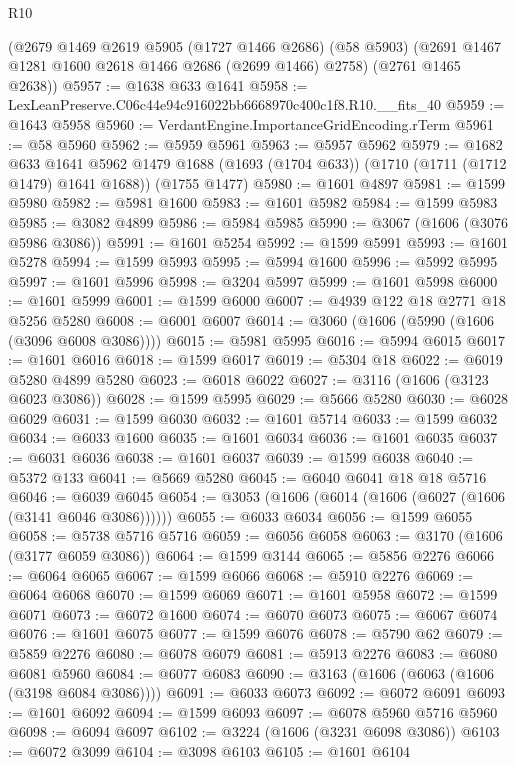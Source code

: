 \begin{lexlean}{R10}
\begin{coremodule}
    (@2679
      @1469
      @2619
      @5905
      (@1727 @1466 @2686)
      (@58 @5903)
      (@2691 @1467 @1281 @1600 @2618 @1466 @2686 (@2699 @1466) @2758)
      (@2761 @1465 @2638))
@5957 := @1638 @633 @1641
@5958 := LexLeanPreserve.C06c44e94c916022bb6668970c400c1f8.R10.__fits_40
@5959 := @1643 @5958
@5960 := VerdantEngine.ImportanceGridEncoding.rTerm
@5961 := @58 @5960
@5962 := @5959 @5961
@5963 := @5957 @5962
@5979 := @1682
    @633
    @1641
    @5962
    @1479
    @1688
    (@1693 (@1704 @633))
    (@1710 (@1711 (@1712 @1479) @1641 @1688))
    (@1755 @1477)
@5980 := @1601 @4897
@5981 := @1599 @5980
@5982 := @5981 @1600
@5983 := @1601 @5982
@5984 := @1599 @5983
@5985 := @3082 @4899
@5986 := @5984 @5985
@5990 := @3067 (@1606 (@3076 @5986 @3086))
@5991 := @1601 @5254
@5992 := @1599 @5991
@5993 := @1601 @5278
@5994 := @1599 @5993
@5995 := @5994 @1600
@5996 := @5992 @5995
@5997 := @1601 @5996
@5998 := @3204 @5997
@5999 := @1601 @5998
@6000 := @1601 @5999
@6001 := @1599 @6000
@6007 := @4939 @122 @18 @2771 @18 @5256 @5280
@6008 := @6001 @6007
@6014 := @3060 (@1606 (@5990 (@1606 (@3096 @6008 @3086))))
@6015 := @5981 @5995
@6016 := @5994 @6015
@6017 := @1601 @6016
@6018 := @1599 @6017
@6019 := @5304 @18
@6022 := @6019 @5280 @4899 @5280
@6023 := @6018 @6022
@6027 := @3116 (@1606 (@3123 @6023 @3086))
@6028 := @1599 @5995
@6029 := @5666 @5280
@6030 := @6028 @6029
@6031 := @1599 @6030
@6032 := @1601 @5714
@6033 := @1599 @6032
@6034 := @6033 @1600
@6035 := @1601 @6034
@6036 := @1601 @6035
@6037 := @6031 @6036
@6038 := @1601 @6037
@6039 := @1599 @6038
@6040 := @5372 @133
@6041 := @5669 @5280
@6045 := @6040 @6041 @18 @18 @5716
@6046 := @6039 @6045
@6054 := @3053 (@1606 (@6014 (@1606 (@6027 (@1606 (@3141 @6046 @3086))))))
@6055 := @6033 @6034
@6056 := @1599 @6055
@6058 := @5738 @5716 @5716
@6059 := @6056 @6058
@6063 := @3170 (@1606 (@3177 @6059 @3086))
@6064 := @1599 @3144
@6065 := @5856 @2276
@6066 := @6064 @6065
@6067 := @1599 @6066
@6068 := @5910 @2276
@6069 := @6064 @6068
@6070 := @1599 @6069
@6071 := @1601 @5958
@6072 := @1599 @6071
@6073 := @6072 @1600
@6074 := @6070 @6073
@6075 := @6067 @6074
@6076 := @1601 @6075
@6077 := @1599 @6076
@6078 := @5790 @62
@6079 := @5859 @2276
@6080 := @6078 @6079
@6081 := @5913 @2276
@6083 := @6080 @6081 @5960
@6084 := @6077 @6083
@6090 := @3163 (@1606 (@6063 (@1606 (@3198 @6084 @3086))))
@6091 := @6033 @6073
@6092 := @6072 @6091
@6093 := @1601 @6092
@6094 := @1599 @6093
@6097 := @6078 @5960 @5716 @5960
@6098 := @6094 @6097
@6102 := @3224 (@1606 (@3231 @6098 @3086))
@6103 := @6072 @3099
@6104 := @3098 @6103
@6105 := @1601 @6104

\end{coremodule}
\end{lexlean}
